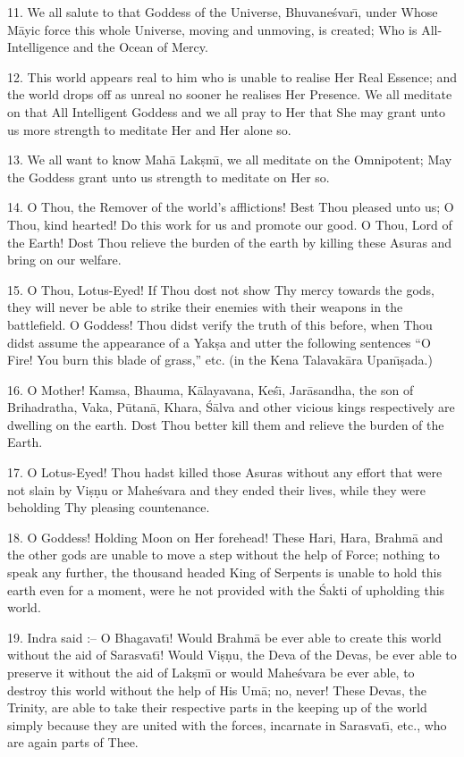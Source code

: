 11. We all salute to that Goddess of the Universe, Bhuvane\'svar\={\i}, under Whose M\=ayic force this whole Universe, moving and unmoving, is created; Who is All-Intelligence and the Ocean of Mercy.

12. This world appears real to him who is unable to realise Her Real Essence; and the world drops off as unreal no sooner he realises Her Presence. We all meditate on that All Intelligent Goddess and we all pray to Her that She may grant unto us more strength to meditate Her and Her alone so.

13. We all want to know Mah\=a Lak\d{s}m\={\i}, we all meditate on the Omnipotent; May the Goddess grant unto us strength to meditate on Her so.

14. O Thou, the Remover of the world's afflictions! Best Thou pleased unto us; O Thou, kind hearted! Do this work for us and promote our good. O Thou, Lord of the Earth! Dost Thou relieve the burden of the earth by killing these Asuras and bring on our welfare.

15. O Thou, Lotus-Eyed! If Thou dost not show Thy mercy towards the gods, they will never be able to strike their enemies with their weapons in the battlefield. O Goddess! Thou didst verify the truth of this before, when Thou didst assume the appearance of a Yak\d{s}a and utter the following sentences ``O Fire! You burn this blade of grass,'' etc. (in the Kena Talavak\=ara Upan\={\i}\d{s}ada.)

16. O Mother! Kamsa, Bhauma, K\=alayavana, Ke\'s\={\i}, Jar\=asandha, the son of Brihadratha, Vaka, P\=utan\=a, Khara, \'S\=alva and other vicious kings respectively are dwelling on the earth. Dost Thou better kill them and relieve the burden of the Earth.

17. O Lotus-Eyed! Thou hadst killed those Asuras without any effort that were not slain by Vi\d{s}\d{n}u or Mahe\'svara and they ended their lives, while they were beholding Thy pleasing countenance.

18. O Goddess! Holding Moon on Her forehead! These Hari, Hara, Brahm\=a and the other gods are unable to move a step without the help of Force; nothing to speak any further, the thousand headed King of Serpents is unable to hold this earth even for a moment, were he not provided with the \'Sakti of upholding this world.

19. Indra said :-- O Bhagavat\={\i}! Would Brahm\=a be ever able to create this world without the aid of Sarasvat\={\i}! Would Vi\d{s}\d{n}u, the Deva of the Devas, be ever able to preserve it without the aid of Lak\d{s}m\={\i} or would Mahe\'svara be ever able, to destroy this world without the help of His Um\=a; no, never! These Devas, the Trinity, are able to take their respective parts in the keeping up of the world simply because they are united with the forces, incarnate in Sarasvat\={\i}, etc., who are again parts of Thee.

